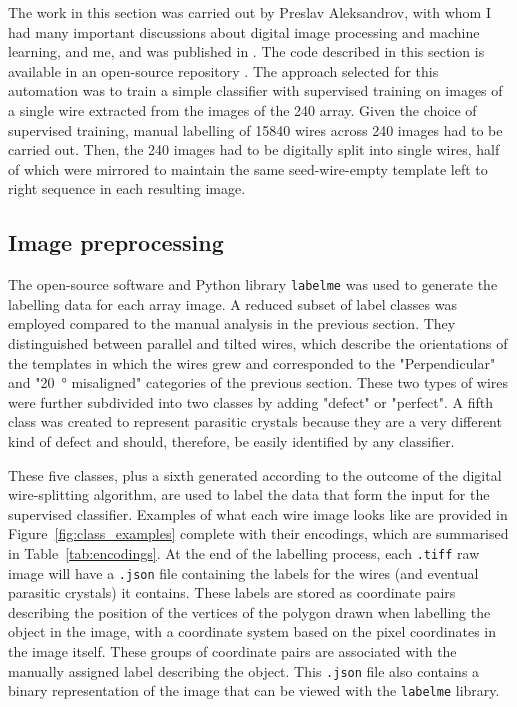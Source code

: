 The work in this section was carried out by Preslav Aleksandrov, with whom I had many important discussions about digital image processing and machine learning, and me, and was published in \cite{Brugnolotto2024}. The code described in this section is available in an open-source repository \cite{code}. The approach selected for this automation was to train a simple classifier with supervised training on images of a single wire extracted from the images of the \num{240} array. Given the choice of supervised training, manual labelling of \num{15840} wires across 240 images had to be carried out. Then, the 240 images had to be digitally split into single wires, half of which were mirrored to maintain the same seed-wire-empty template left to right sequence in each resulting image.

\subsection{Image preprocessing}

The open-source software and Python \cite{python} library \texttt{labelme} \cite{labelme2016} was used to generate the labelling data for each array image. A reduced subset of label classes was employed compared to the manual analysis in the previous section. They distinguished between parallel and tilted wires, which describe the orientations of the templates in which the wires grew and corresponded to the "Perpendicular" and "\qty{20}{\degree} misaligned" categories of the previous section. These two types of wires were further subdivided into two classes by adding "defect" or "perfect". A fifth class was created to represent parasitic crystals because they are a very different kind of defect and should, therefore, be easily identified by any classifier.

These five classes, plus a sixth generated according to the outcome of the digital wire-splitting algorithm, are used to label the data that form the input for the supervised classifier. Examples of what each wire image looks like are provided in Figure~\ref{fig:class_examples} complete with their encodings, which are summarised in Table~\ref{tab:encodings}. At the end of the labelling process, each \texttt{.tiff} raw image will have a \texttt{.json} file containing the labels for the wires (and eventual parasitic crystals) it contains. These labels are stored as coordinate pairs describing the position of the vertices of the polygon drawn when labelling the object in the image, with a coordinate system based on the pixel coordinates in the image itself. These groups of coordinate pairs are associated with the manually assigned label describing the object. This \texttt{.json} file also contains a binary representation of the image that can be viewed with the \texttt{labelme} library.

